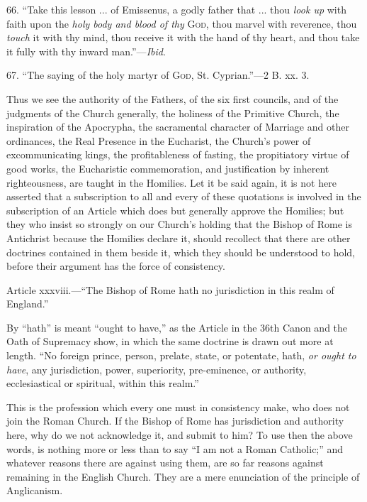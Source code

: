 66. ``Take this lesson ... of Emissenus, a godly father that
... thou \emph{look up} with faith upon the \emph{holy body and blood of
thy} G\textsc{od}, thou marvel with reverence, thou \emph{touch}
it with thy mind, thou receive it with the hand of thy heart,
and thou take it fully with thy inward man.''—\emph{Ibid}.

67. ``The saying of the holy martyr of G\textsc{od},
St. Cyprian.''—2 B. xx. 3.

Thus we see the authority of the Fathers, of the six first
councils, and of the judgments of the Church generally, the holiness
of the Primitive Church, the inspiration of the Apocrypha, the
sacramental character of Marriage and other ordinances, the Real
Presence in the Eucharist, the Church's power of excommunicating
kings, the profitableness of fasting, the propitiatory virtue of good
works, the Eucharistic commemoration, and justification by inherent
righteousness, are taught in the Homilies. Let it be said again, it is
not here asserted that a subscription to all and every of these
quotations is involved in the subscription of an Article which does
but generally approve the Homilies; but they who insist so strongly on
our Church's holding that the Bishop of Rome is Antichrist because the
Homilies declare it, should recollect that there are other doctrines
contained in them beside it, which they should be understood to hold,
before their argument has the force of consistency.


Article xxxviii.—``The Bishop of Rome hath no jurisdiction in
this realm of England.''

By ``hath'' is meant ``ought to have,'' as the
Article in the 36th Canon and the Oath of Supremacy show, in which the
same doctrine is drawn out more at length. ``No foreign prince,
person, prelate, state, or potentate, hath, \emph{or ought to have},
any jurisdiction, power, superiority, pre-eminence, or authority,
ecclesiastical or spiritual, within this realm.''

This is the profession which every one must in consistency make,
who does not join the Roman Church. If the Bishop of Rome has
jurisdiction and authority here, why do we not acknowledge it, and
submit to him? To use then the above words, is nothing more or less
than to say ``I am not a Roman Catholic;'' and whatever
reasons there are against using them, are so far reasons against
remaining in the English Church. They are a mere enunciation of the
principle of Anglicanism.

